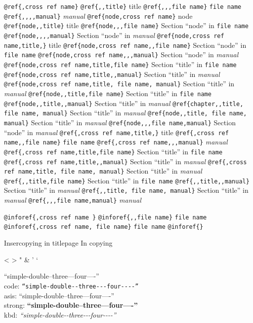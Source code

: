 \documentclass{book}
\begin{document}
\begin{titlepage}
\texttt{@ref\{,cross ref name\}} 
\texttt{@ref\{,,title\}} title
\texttt{@ref\{,,,file name\}} \texttt{file name}
\texttt{@ref\{,,,,manual\}} \textit{manual}
\texttt{@ref\{node,cross ref name\}} node
\texttt{@ref\{node,,title\}} title
\texttt{@ref\{node,,,file name\}} Section ``node'' in \texttt{file name}
\texttt{@ref\{node,,,,manual\}} Section ``node'' in \textit{manual}
\texttt{@ref\{node,cross ref name,title,\}} title
\texttt{@ref\{node,cross ref name,,file name\}} Section ``node'' in \texttt{file name}
\texttt{@ref\{node,cross ref name,,,manual\}} Section ``node'' in \textit{manual}
\texttt{@ref\{node,cross ref name,title,file name\}} Section ``title'' in \texttt{file name}
\texttt{@ref\{node,cross ref name,title,,manual\}} Section ``title'' in \textit{manual}
\texttt{@ref\{node,cross ref name,title, file name, manual\}} Section ``title'' in \textit{manual}
\texttt{@ref\{node,,title,file name\}} Section ``title'' in \texttt{file name}
\texttt{@ref\{node,,title,,manual\}} Section ``title'' in \textit{manual}
\texttt{@ref\{chapter,,title, file name, manual\}} Section ``title'' in \textit{manual}
\texttt{@ref\{node,,title, file name, manual\}} Section ``title'' in \textit{manual}
\texttt{@ref\{node,,,file name,manual\}} Section ``node'' in \textit{manual}
\texttt{@ref\{,cross ref name,title,\}} title
\texttt{@ref\{,cross ref name,,file name\}} \texttt{file name}
\texttt{@ref\{,cross ref name,,,manual\}} \textit{manual}
\texttt{@ref\{,cross ref name,title,file name\}} Section ``title'' in \texttt{file name}
\texttt{@ref\{,cross ref name,title,,manual\}} Section ``title'' in \textit{manual}
\texttt{@ref\{,cross ref name,title, file name, manual\}} Section ``title'' in \textit{manual}
\texttt{@ref\{,,title,file name\}} Section ``title'' in \texttt{file name}
\texttt{@ref\{,,title,,manual\}} Section ``title'' in \textit{manual}
\texttt{@ref\{,,title, file name, manual\}} Section ``title'' in \textit{manual}
\texttt{@ref\{,,,file name,manual\}} \textit{manual}

\texttt{@inforef\{,cross ref name \}} 
\texttt{@inforef\{,,file name\}} \texttt{file name}
\texttt{@inforef\{,cross ref name, file name\}} \texttt{file name}
\texttt{@inforef\{\}} 



Insercopying in titlepage
In copying

<
>
"
\&
'
`

``simple-double--three---four----''\leavevmode{}\\
code: \texttt{``simple-double{-}{-}three{-}{-}{-}four{-}{-}{-}-''} \leavevmode{}\\
asis: ``simple-double--three---four----'' \leavevmode{}\\
strong: \textbf{``simple-double--three---four----''} \leavevmode{}\\
kbd: {\ttfamily\textsl{``simple-double{-}{-}three{-}{-}{-}four{-}{-}{-}-''}} \leavevmode{}\\


\end{titlepage}
\end{document}
